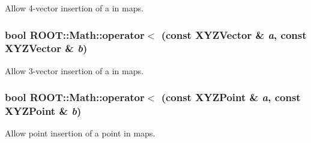 Allow 4-\/vector insertion of a in maps. \hypertarget{namespace_r_o_o_t_1_1_math_a3bf72adbd1dc8071ef0283f0e253974a}{
\subsubsection[{operator$<$}]{\setlength{\rightskip}{0pt plus 5cm}bool ROOT::Math::operator$<$ (const XYZVector \& {\em a}, \/  const XYZVector \& {\em b})}}
\label{namespace_r_o_o_t_1_1_math_a3bf72adbd1dc8071ef0283f0e253974a}


Allow 3-\/vector insertion of a in maps. \hypertarget{namespace_r_o_o_t_1_1_math_ae526386c3fc57d159a6b9f227c859521}{
\subsubsection[{operator$<$}]{\setlength{\rightskip}{0pt plus 5cm}bool ROOT::Math::operator$<$ (const XYZPoint \& {\em a}, \/  const XYZPoint \& {\em b})}}
\label{namespace_r_o_o_t_1_1_math_ae526386c3fc57d159a6b9f227c859521}


Allow point insertion of a point in maps. 